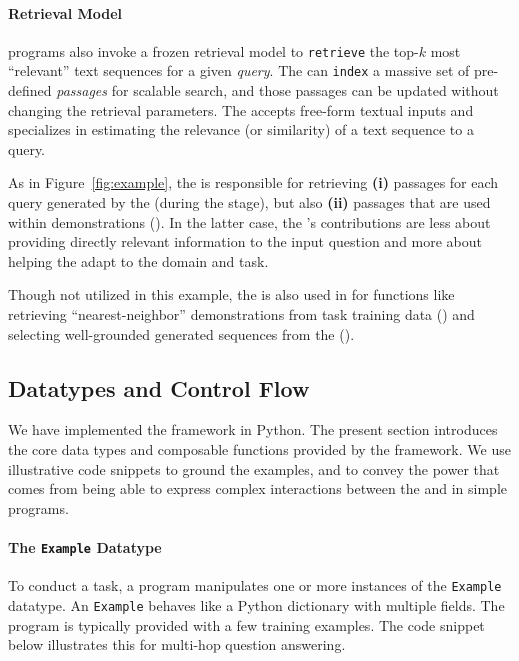 \vspace{-2mm}
\paragraph{Retrieval Model} \DSP programs also invoke a frozen retrieval model \RM{} to \texttt{retrieve} the top-$k$ most ``relevant'' text sequences for a given \textit{query}. The \RM{} can \texttt{index} a massive set of pre-defined \textit{passages} for scalable search, and those passages can be updated without changing the retrieval parameters. %
The \RM{} accepts free-form textual inputs and specializes in estimating the relevance (or similarity) of a text sequence to a query.

As in Figure~\ref{fig:example}, the \RM{} is responsible for retrieving \textbf{(i)} passages for each query generated by the \LM{} (during the \search stage), but also \textbf{(ii)} passages that are used within demonstrations (\demonstrate). In the latter case, the \RM's contributions are less about providing directly relevant information to the input question and more about helping the \LM{} adapt to the domain and task.

Though not utilized in this example, the \RM{} is also used in \DSP for functions like retrieving ``nearest-neighbor'' demonstrations from task training data (\demonstrate) and selecting well-grounded generated sequences from the \LM{} (\predict).

\subsection{Datatypes and Control Flow}
\label{sec:dsp:concepts}

We have implemented the \DSP{} framework in Python. The present section introduces the core data types and composable functions provided by the framework. We use illustrative code snippets to ground the examples, and to convey the power that comes from being able to express complex interactions between the \LM{} and \RM{} in simple programs.

\vspace{-2mm}
\paragraph{The \texttt{Example} Datatype} To conduct a task, a \DSP program manipulates one or more instances of the \texttt{Example} datatype. An \texttt{Example} behaves like a Python dictionary with multiple fields. The program is typically provided with a few training examples. The code snippet below illustrates this for multi-hop question answering.

